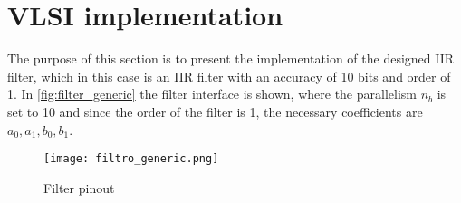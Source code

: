 \section{VLSI implementation}
\graphicspath{{sec2/images/}}
The purpose of this section is to present the implementation of the designed IIR filter, which in this case is an IIR filter with an accuracy of 10 bits and order of 1. In \autoref{fig:filter_generic} the filter interface is shown, where the parallelism $n_b$ is set to 10 and since the order of the filter is 1, the necessary coefficients are $a_0, a_1, b_0, b_1$.

\begin{figure}[h]
	\center
	\texttt{[image: filtro\_generic.png]}
	\caption{Filter pinout}
	\label{fig:filter_generic}
\end{figure}






\pagebreak
